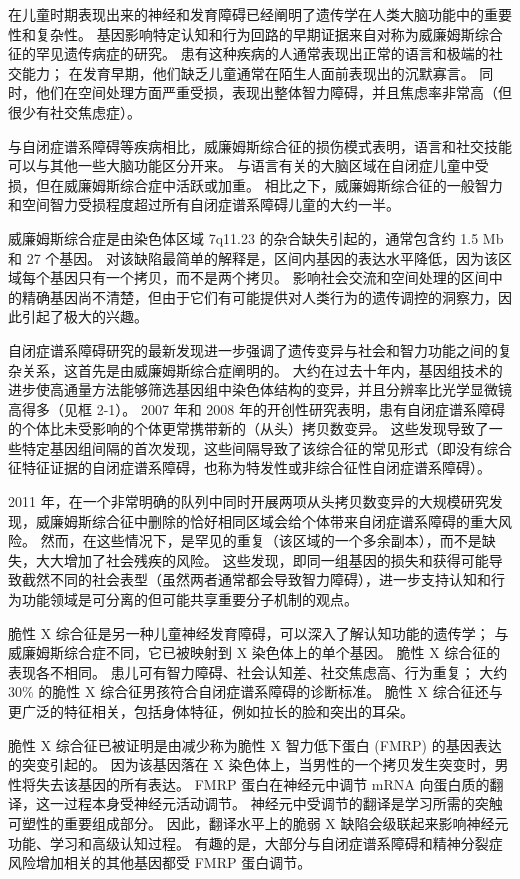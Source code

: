 在儿童时期表现出来的神经和发育障碍已经阐明了遗传学在人类大脑功能中的重要性和复杂性。 
基因影响特定认知和行为回路的早期证据来自对称为威廉姆斯综合征的罕见遗传病症的研究。 
患有这种疾病的人通常表现出正常的语言和极端的社交能力； 
在发育早期，他们缺乏儿童通常在陌生人面前表现出的沉默寡言。 
同时，他们在空间处理方面严重受损，表现出整体智力障碍，并且焦虑率非常高（但很少有社交焦虑症）。


与自闭症谱系障碍等疾病相比，威廉姆斯综合征的损伤模式表明，语言和社交技能可以与其他一些大脑功能区分开来。 
与语言有关的大脑区域在自闭症儿童中受损，但在威廉姆斯综合症中活跃或加重。 
相比之下，威廉姆斯综合征的一般智力和空间智力受损程度超过所有自闭症谱系障碍儿童的大约一半。


威廉姆斯综合症是由染色体区域 7q11.23 的杂合缺失引起的，通常包含约 1.5 Mb 和 27 个基因。 
对该缺陷最简单的解释是，区间内基因的表达水平降低，因为该区域每个基因只有一个拷贝，而不是两个拷贝。 
影响社会交流和空间处理的区间中的精确基因尚不清楚，但由于它们有可能提供对人类行为的遗传调控的洞察力，因此引起了极大的兴趣。


自闭症谱系障碍研究的最新发现进一步强调了遗传变异与社会和智力功能之间的复杂关系，这首先是由威廉姆斯综合症阐明的。 
大约在过去十年内，基因组技术的进步使高通量方法能够筛选基因组中染色体结构的变异，并且分辨率比光学显微镜高得多（见框 2-1）。 
2007 年和 2008 年的开创性研究表明，患有自闭症谱系障碍的个体比未受影响的个体更常携带新的（从头）拷贝数变异。 
这些发现导致了一些特定基因组间隔的首次发现，这些间隔导致了该综合征的常见形式（即没有综合征特征证据的自闭症谱系障碍，也称为特发性或非综合征性自闭症谱系障碍）。


2011 年，在一个非常明确的队列中同时开展两项从头拷贝数变异的大规模研究发现，威廉姆斯综合征中删除的恰好相同区域会给个体带来自闭症谱系障碍的重大风险。 
然而，在这些情况下，是罕见的重复（该区域的一个多余副本），而不是缺失，大大增加了社会残疾的风险。 
这些发现，即同一组基因的损失和获得可能导致截然不同的社会表型（虽然两者通常都会导致智力障碍），进一步支持认知和行为功能领域是可分离的但可能共享重要分子机制的观点。


脆性 X 综合征是另一种儿童神经发育障碍，可以深入了解认知功能的遗传学； 与威廉姆斯综合症不同，它已被映射到 X 染色体上的单个基因。 
脆性 X 综合征的表现各不相同。 
患儿可有智力障碍、社会认知差、社交焦虑高、行为重复； 
大约 30\% 的脆性 X 综合征男孩符合自闭症谱系障碍的诊断标准。 
脆性 X 综合征还与更广泛的特征相关，包括身体特征，例如拉长的脸和突出的耳朵。


脆性 X 综合征已被证明是由减少称为脆性 X 智力低下蛋白 (FMRP) 的基因表达的突变引起的。 
因为该基因落在 X 染色体上，当男性的一个拷贝发生突变时，男性将失去该基因的所有表达。 
FMRP 蛋白在神经元中调节 mRNA 向蛋白质的翻译，这一过程本身受神经元活动调节。 
神经元中受调节的翻译是学习所需的突触可塑性的重要组成部分。 
因此，翻译水平上的脆弱 X 缺陷会级联起来影响神经元功能、学习和高级认知过程。 
有趣的是，大部分与自闭症谱系障碍和精神分裂症风险增加相关的其他基因都受 FMRP 蛋白调节。


